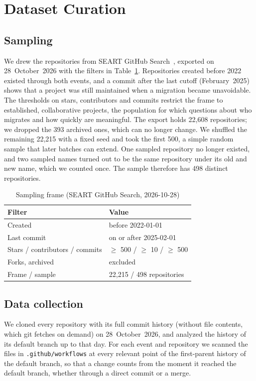 \section{Dataset Curation}\label{sec:data}

\subsection{Sampling}
We drew the repositories from SEART GitHub Search~\cite{dabic2021seart}, exported on 28~October~2026 with the filters in Table~\ref{tab:frame}.
Repositories created before 2022 existed through both events, and a commit after the last cutoff (February~2025) shows that a project was still maintained when a migration became unavoidable.
The thresholds on stars, contributors and commits restrict the frame to established, collaborative projects, the population for which questions about who migrates and how quickly are meaningful.
The export holds 22,608 repositories; we dropped the 393 archived ones, which can no longer change.
We shuffled the remaining 22,215 with a fixed seed and took the first 500, a simple random sample that later batches can extend.
One sampled repository no longer existed, and two sampled names turned out to be the same repository under its old and new name, which we counted once.
The sample therefore has 498 distinct repositories.

\begin{table}[t]
\caption{Sampling frame (SEART GitHub Search, 2026-10-28)}\label{tab:frame}
\centering\small
\begin{tabular}{@{}ll@{}}
\toprule
\textbf{Filter} & \textbf{Value} \\
\midrule
Created & before 2022-01-01 \\
Last commit & on or after 2025-02-01 \\
Stars / contributors / commits & $\geq$ 500 / $\geq$ 10 / $\geq$ 500 \\
Forks, archived & excluded \\
\midrule
Frame / sample & 22,215 / 498 repositories \\
\bottomrule
\end{tabular}
\end{table}

\subsection{Data collection}
We cloned every repository with its full commit history (without file contents, which git fetches on demand) on 28~October~2026, and analyzed the history of its default branch up to that day.
For each event and repository we scanned the files in \texttt{.github/workflows} at every relevant point of the first-parent history of the default branch, so that a change counts from the moment it reached the default branch, whether through a direct commit or a merge.

